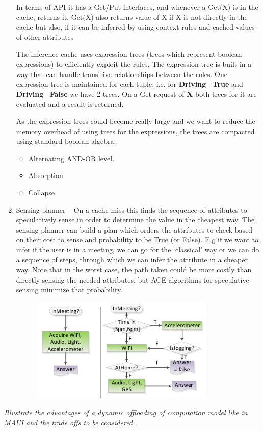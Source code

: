 \documentclass[12pt]{article}
\newcommand*\circled[1]{\tikz[baseline=(char.base)]{
		\node[shape=circle,draw,inner sep=0pt] (char) {#1};}}
\begin{document}
\begin{enumerate}[1.]
        In terms of API it has a Get/Put interfaces, and whenever a Get(X) is
        in the cache, returns it. Get(X) also returns value of X if X is not 
        directly in the cache but also, if it can be inferred by using context rules
        and cached values of other attributes

        The inference cache uses expression trees (trees which represent boolean expressions)
        to efficiently exploit the rules. The expression tree is built in a way that can
        handle transitive relationships between the rules. One expression tree is 
        maintained for each tuple, i.e. for \textbf{Driving=True} and \textbf{Driving=False}
        we have 2 trees. On a Get request of \textbf{X} both trees for it are evaluated and
        a result is returned.

        As the expression trees could become really large and we want to reduce the
        memory overhead of using trees for the expressions, the trees are compacted 
        using standard boolean algebra:
        \begin{itemize}
            \item Alternating AND-OR level.
            \item Absorption
            \item Collapse
        \end{itemize}

    \item Sensing planner -- On a cache miss this finds the sequence of attributes to
        speculatively sense in order to determine the value in the cheapest way. The 
        sensing planner can build a plan which orders the attributes to check based
        on their cost to sense and probability to be True (or False). E.g if we 
        want to infer if the user is in a meeting, we can go for the `classical' way
        or we can do a sequence of steps, through which we can infer the attribute in
        a cheaper way. Note that in the worst case, the path taken could be more costly
        than directly sensing the needed attributes, but ACE algorithms for speculative
        sensing minimize that probability.
        \begin{figure}[H]
            \centering
            \includegraphics[width=250pt]{conditional_plan.png}
        \end{figure}
\end{enumerate}
\textit{\circled{6.} Illustrate the advantages of a dynamic offloading of
computation model like in MAUI and the trade offs to be considered..}
\end{document}
